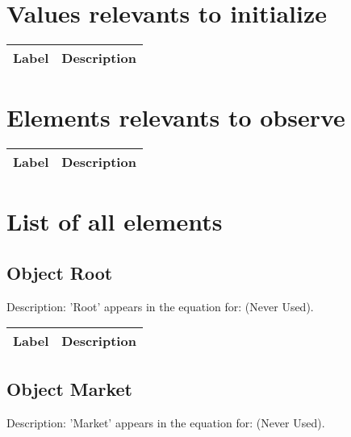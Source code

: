 \newcommand{\lsd}[1] {\textit{#1}}
\section{Values relevants to initialize}
\begin{longtable}{||p{3cm}|p{10cm}||}
  \hline
  \textbf{Label} & \textbf{Description} \\  \hline \endhead 
\end{longtable}

\section{Elements relevants to observe}
\begin{longtable}{||p{3cm}|p{10cm}||}
  \hline
  \textbf{Label} & \textbf{Description} \\  \hline \endhead 
\end{longtable}

\section{List of all elements}
\subsection{Object \textbf{Root}}

Description: 
'Root' appears in the equation for: (Never Used).


\begin{longtable}{||p{3cm}|p{11cm}||}
  \hline
  \textbf{Label} & \textbf{Description} \\  \hline \endhead 
\end{longtable}

\subsection{Object \textbf{Market}}

Description: 'Market' appears in the equation for: (Never Used).


